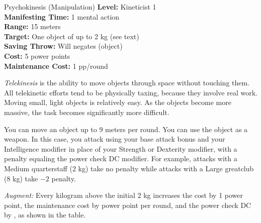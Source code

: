 {Psychokinesis (Manipulation)}
{
	\textbf{Level:}
	Kineticist 1\\
	\textbf{Manifesting Time:}
	1 mental action\\
	\textbf{Range:}
	15 meters\\
	\textbf{Target:}
	One object of up to 2 kg (see text)\\
	\textbf{Saving Throw:}
	Will negates (object)\\
	\textbf{Cost:}
	5 power points\\
	\textbf{Maintenance Cost:}
	1 pp/round\\
}
{
	\emph{Telekinesis} is the ability to move objects through space without touching them.  All telekinetic efforts tend to be physically taxing, because they involve real work. Moving small, light objects is relatively easy. As the objects become more massive, the task becomes significantly more difficult.

	You can move an object up to 9 meters per round. You can use the object as a weapon. In this case, you attack using your base attack bonus and your Intelligence modifier in place of your Strength or Dexterity modifier, with a penalty equaling the power check DC modifier. For example, attacks with a Medium quarterstaff (2 kg) take no penalty while attacks with a Large greatclub (8 kg) take $-2$ penalty.

	\textit{Augment:} Every kilogram above the initial 2 kg increases the cost by 1 power point, the maintenance cost by \onehalf power point per round, and the power check DC by \onethird, as shown in the table. 

}